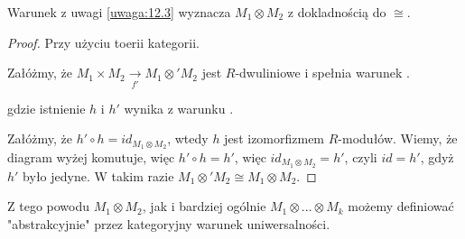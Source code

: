 \begin{remark} Warunek \hyperref[warunek:z:12.3]{{\color{purple}\PHcat}} z uwagi \ref{uwaga:12.3} wyznacza $M_1\otimes M_2$ z dokladnością do $\cong$.
\end{remark}

\begin{proof} Przy użyciu toerii kategorii.

  Załóżmy, że $M_1\times M_2\xrightarrow[f']{} M_1\otimes' M_2$ jest $R$-dwuliniowe i spełnia warunek \hyperref[warunek:z:12.3]{{\color{purple}\PHcat}}. 

  \begin{center}\end{center}
  gdzie istnienie $h$ i $h'$ wynika z warunku \hyperref[warunek:z:12.3]{{\color{purple}\PHcat}}.



  Załóżmy, że $h'\circ h=id_{M_1\otimes M_2}$, wtedy $h$ jest izomorfizmem $R$-modułów. Wiemy, że diagram wyżej komutuje, więc $h'\circ h=h'$, więc $id_{M_1\otimes M_2}=h'$, czyli $id=h'$, gdyż $h'$ było jedyne. W takim razie $M_1\otimes'M_2\cong M_1\otimes M_2$.
\end{proof}

Z tego powodu $M_1\otimes M_2$, jak i bardziej ogólnie $M_1\otimes...\otimes M_k$ możemy definiować "abstrakcyjnie" przez kategoryjny warunek uniwersalności.
